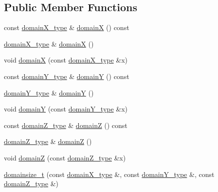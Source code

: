 \subsection*{Public Member Functions}
\begin{DoxyCompactItemize}
\item 
const \hyperlink{classdomainsize__t_a854a03c90869763fcf75511fadb5caef}{domain\-X\-\_\-type} \& \hyperlink{classdomainsize__t_af20451fc039e3472ed3e136aa7a461a5}{domain\-X} () const 
\item 
\hyperlink{classdomainsize__t_a854a03c90869763fcf75511fadb5caef}{domain\-X\-\_\-type} \& \hyperlink{classdomainsize__t_a51adb020afa231bfabfdb214748d146c}{domain\-X} ()
\item 
void \hyperlink{classdomainsize__t_a453d5f0fbfdf2a441f42a84c757efb5f}{domain\-X} (const \hyperlink{classdomainsize__t_a854a03c90869763fcf75511fadb5caef}{domain\-X\-\_\-type} \&x)
\item 
const \hyperlink{classdomainsize__t_a668c8a71e21505b0ad029fa62f996085}{domain\-Y\-\_\-type} \& \hyperlink{classdomainsize__t_a8a3e29ee2c5a8fa874fc5b8ea3279fbe}{domain\-Y} () const 
\item 
\hyperlink{classdomainsize__t_a668c8a71e21505b0ad029fa62f996085}{domain\-Y\-\_\-type} \& \hyperlink{classdomainsize__t_a02af32eae86f59729b6e470d29bdf179}{domain\-Y} ()
\item 
void \hyperlink{classdomainsize__t_acb85a302d01748db733e5abaffdfffa7}{domain\-Y} (const \hyperlink{classdomainsize__t_a668c8a71e21505b0ad029fa62f996085}{domain\-Y\-\_\-type} \&x)
\item 
const \hyperlink{classdomainsize__t_ab33974c39e210e214cc02d863326cf5c}{domain\-Z\-\_\-type} \& \hyperlink{classdomainsize__t_a080be013bdf69600372f49a007c376aa}{domain\-Z} () const 
\item 
\hyperlink{classdomainsize__t_ab33974c39e210e214cc02d863326cf5c}{domain\-Z\-\_\-type} \& \hyperlink{classdomainsize__t_a79339a29b7b8305012b25b8d852dccbc}{domain\-Z} ()
\item 
void \hyperlink{classdomainsize__t_a62ddcdb57fd557fd0f7f62df422aee46}{domain\-Z} (const \hyperlink{classdomainsize__t_ab33974c39e210e214cc02d863326cf5c}{domain\-Z\-\_\-type} \&x)
\item 
\hyperlink{classdomainsize__t_a11ff7a4d86e7d942149499f5ac0b35f0}{domainsize\-\_\-t} (const \hyperlink{classdomainsize__t_a854a03c90869763fcf75511fadb5caef}{domain\-X\-\_\-type} \&, const \hyperlink{classdomainsize__t_a668c8a71e21505b0ad029fa62f996085}{domain\-Y\-\_\-type} \&, const \hyperlink{classdomainsize__t_ab33974c39e210e214cc02d863326cf5c}{domain\-Z\-\_\-type} \&)

\end{DoxyCompactItemize}
